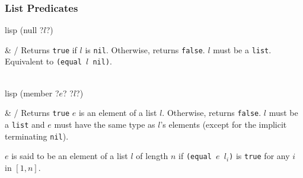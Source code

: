 \subsubsection{List Predicates}
\begin{funcdefs}
    \begin{minipage}[t]{\linewidth}
        \centering
        \begin{cminted}[autogobble=true, escapeinside=??]{lisp}
            (null ?$l$?)
        \end{cminted}
    \end{minipage}
    & \specialf/ Returns \texttt{true} if $l$ is \texttt{nil}. Otherwise, returns \texttt{false}. $l$ must be a \texttt{list}. Equivalent to \texttt{(equal $l$ nil)}.
    \\ \\
    \begin{minipage}[t]{\linewidth}
        \centering
        \begin{cminted}[autogobble=true, escapeinside=??]{lisp}
            (member ?$e$? ?$l$?)
        \end{cminted}
    \end{minipage}
    & \specialf/ Returns \texttt{true} $e$ is an element of a list $l$. Otherwise, returns \texttt{false}. $l$ must be a \texttt{list} and $e$ must have the same type as $l$'s elements (except for the implicit terminating \texttt{nil}).
    \setlength{\parindent}{1.5em}%
    \par\indent%
    $e$ is said to be an element of a list $l$ of length $n$ if \texttt{(equal $e$ $l_i$)} is \texttt{true} for any $i$ in $[1, n]$.
\end{funcdefs}


